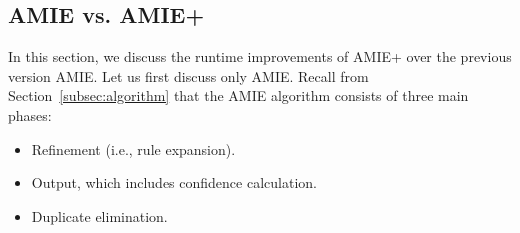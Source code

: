\subsection{AMIE vs. AMIE+}\label{amiepm}

In this section, we discuss the runtime improvements of AMIE+ over the previous version AMIE.
Let us first discuss only AMIE. Recall from Section~\ref{subsec:algorithm} that the AMIE algorithm consists of three main phases:
\begin{itemize}
 \item Refinement (i.e., rule expansion).
 \item Output, which includes confidence calculation. %
 \item Duplicate elimination.
\end{itemize}


